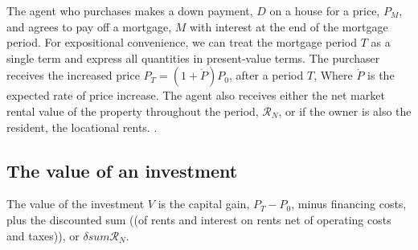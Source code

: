 

    
 The agent who purchases makes a down payment, $D$ on a house for a price, $P_M$, and agrees to pay off a mortgage, $M$ with interest at the end of the mortgage period. For expositional convenience, we can treat the mortgage period $T$ as a single term and express all quantities  in present-value terms. The purchaser  receives the increased price $P_T = (1 + \dot P)P_0$,  after a period $T$, Where $\dot P$ is the expected rate of price increase. The agent also receives either the net market rental value of the property throughout the period, $\mathcal{R}_N$, or if the owner is also the resident, the locational rents.
\cite{anselinModernSpatialEconometrics2014, gelmanDataAnalysisUsing2006}.





 \subsection{The value of an investment}

The value of the investment $V$ is  the capital gain, $P_{T}-P_{0}$, minus financing costs, plus the discounted sum ((of rents and interest on rents net of operating costs and taxes)), or $\delta sum\mathcal{R}_N$.  
 
